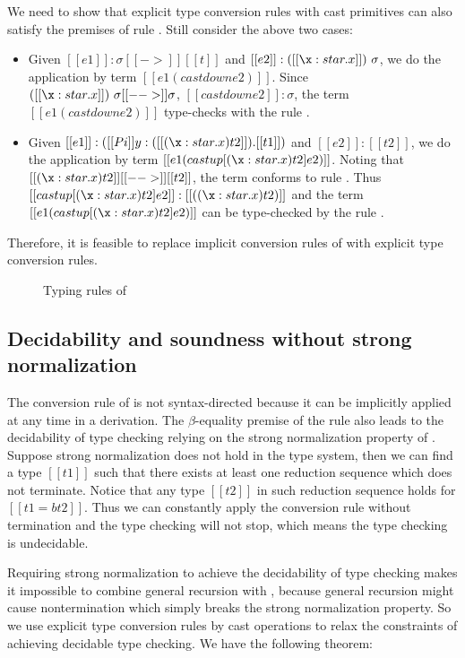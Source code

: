 We need to show that explicit type conversion rules with cast primitives can also satisfy the premises of rule . Still consider the above two cases:
\begin{itemize}
\item Given $[[e1]]:\sigma [[->]] [[t]]$ and $[[e2]] : ([[\x:star.x]])~\sigma$, we do the application by term $[[e1 (castdown e2)]]$. Since $([[\x:star.x]])~\sigma [[-->]] \sigma$, $[[castdown e2]] : \sigma$, the term $[[e1 (castdown e2)]]$ type-checks with the rule .
\item Given $[[e1]] : ([[Pi]] y:([[(\x : star . x) t2]]).[[t1]])$ and $[[e2]] : [[t2]]$, we do the application by term $[[e1 (castup [ (\x : star . x) t2 ] e2)]]$. Noting that $[[(\x : star . x) t2]] [[-->]] [[t2]]$, the term conforms to rule . Thus $[[castup [ (\x : star . x) t2 ] e2]] : [[((\x : star . x) t2)]]$ and the term $[[e1 (castup [ (\x : star . x) t2 ] e2)]]$ can be type-checked by the rule .
\end{itemize}

Therefore, it is feasible to replace implicit conversion rules of \cc with explicit type conversion rules.

\begin{figure}[ht]
	\ottdefnexpr{}
	\caption{Typing rules of \expcc}
	\label{fig:ecc:typerule}
\end{figure}

\subsection{Decidability and soundness without strong normalization}
The conversion rule of \cc is not syntax-directed because it can be implicitly applied at any time in a derivation. The $\beta$-equality premise of the rule also leads to the decidability of type checking relying on the strong normalization property of \cc. Suppose strong normalization does not hold in the type system, then we can find a type $[[t1]]$ such that there exists at least one reduction sequence which does not terminate. Notice that any type $[[t2]]$ in such reduction sequence holds for $[[t1 =b t2]]$. Thus we can constantly apply the conversion rule without termination and the type checking will not stop, which means the type checking is undecidable.

Requiring strong normalization to achieve the decidability of type checking makes it impossible to combine general recursion with \cc, because general recursion might cause nontermination which simply breaks the strong normalization property. So we use explicit type conversion rules by cast operations to relax the constraints of achieving decidable type checking. We have the following theorem:

